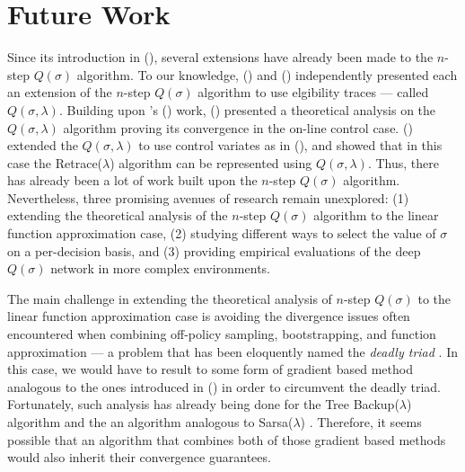 \section{Future Work}

Since its introduction in \citeauthor{sutton2018} (\citeyear{sutton2018}), several extensions have already been made to the $n$-step $Q(\sigma)$ algorithm.
To our knowledge, \citeauthor{markus_dumke} (\citeyear{markus_dumke}) and \citeauthor{anna2017} (\citeyear{anna2017}) independently presented each an extension of the $n$-step $Q(\sigma)$ algorithm to use elgibility traces --- called $Q(\sigma, \lambda)$.
Building upon \citeauthor{markus_dumke}'s (\citeyear{markus_dumke}) work, \citeauthor{long2018} (\citeyear{long2018}) presented a theoretical analysis on the $Q(\sigma, \lambda)$ algorithm proving its convergence in the on-line control case.
\citeauthor{deasis_msc_thesis} (\citeyear{deasis_msc_thesis}) extended the $Q(\sigma, \lambda)$ to use control variates as in \citeauthor{deasis2018} (\citeyear{deasis2018}), and showed that in this case the Retrace($\lambda$) algorithm \parencite{remi_retrace} can be represented using $Q(\sigma, \lambda)$.
Thus, there has already been a lot of work built upon the $n$-step $Q(\sigma)$ algorithm. 
Nevertheless, three promising avenues of research remain unexplored: (1) extending the theoretical analysis of the $n$-step $Q(\sigma)$ algorithm to the linear function approximation case, (2) studying different ways to select the value of $\sigma$ on a per-decision basis, and (3) providing empirical evaluations of the deep $Q(\sigma)$ network in more complex environments.

The main challenge in extending the theoretical analysis of $n$-step $Q(\sigma)$ to the linear function approximation case is avoiding the divergence issues often encountered when combining off-policy sampling, bootstrapping, and function approximation --- a problem that has been eloquently named the \textit{deadly triad} \parencite{sutton2018}.
In this case, we would have to result to some form of gradient based method analogous to the ones introduced in \citeauthor{maei_gtd} (\citeyear{maei_gtd}) in order to circumvent the deadly triad.
Fortunately, such analysis has already being done for the Tree Backup($\lambda$) algorithm \parencite{ahmed_treebackup} and the an algorithm analogous to Sarsa($\lambda$) \parencite{maei_gtd}.
Therefore, it seems possible that an algorithm that combines both of those gradient based methods would also inherit their convergence guarantees.

